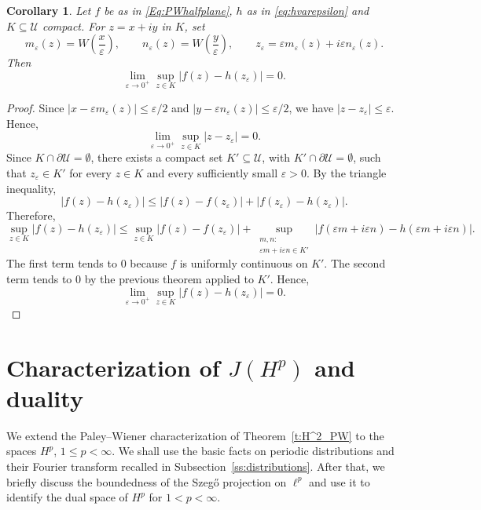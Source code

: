 \documentclass[12pt,a4paper,reqno]{amsart}
\newtheorem{cor}[thm]{Corollary}
\theoremstyle{definition}
\theoremstyle{definition}\newtheorem{defn}[thm]{Definition}
\begin{document}
    \begin{cor}
    Let $f$ be as in \eqref{Eq:PWhalfplane}, $h$ as in \eqref{eq:hvarepsilon} and $K\subseteq\mathcal U$ compact. For $z=x+iy$ in $K$, set
    \[
    m_\varepsilon(z)=W\!\left(\frac{x}{\varepsilon}\right),
    \qquad
    n_\varepsilon(z)=W\!\left(\frac{y}{\varepsilon}\right),\qquad z_\varepsilon
    =
    \varepsilon m_\varepsilon(z)
    +
    i\varepsilon n_\varepsilon(z).
    \]
    Then
    \[
    \lim_{\varepsilon\to 0^+}\sup_{z\in K}
    \left|
    f(z)-h(z_\varepsilon)
    \right|=0.
    \]
    \end{cor}
    \begin{proof}
    Since
    $
    \left|x-\varepsilon m_\varepsilon(z)\right|
    \leqslant \varepsilon/2$ and $
    \left|y-\varepsilon n_\varepsilon(z)\right|
    \leqslant \varepsilon/2$, we have $|z-z_\varepsilon|
    \leqslant \varepsilon$. Hence,
    \[
    \lim_{\varepsilon\to 0^+}\sup_{z\in K}|z-z_\varepsilon|=0.
    \]
    Since $K\cap \partial\mathcal U=\emptyset$, there exists a compact set
    $K'\subseteq\mathcal U$, with $K'\cap \partial\mathcal U=\emptyset$, such that
    $z_\varepsilon\in K'$ for every $z\in K$ and every sufficiently small
    $\varepsilon>0$. By the triangle inequality,
    \[
    |f(z)-h(z_\varepsilon)|
    \leqslant
    |f(z)-f(z_\varepsilon)|
    +
    |f(z_\varepsilon)-h(z_\varepsilon)|.
    \]
    Therefore,
    \[
    \sup_{z\in K}|f(z)-h(z_\varepsilon)|
    \leqslant
    \sup_{z\in K}|f(z)-f(z_\varepsilon)|+
    \sup_{\substack{m,n:\\
    \varepsilon m+i\varepsilon n\in K'}}
    |f(\varepsilon m+i\varepsilon n)
    -
    h(\varepsilon m+i\varepsilon n)|.
    \]
    The first term tends to $0$ because $f$ is uniformly continuous on $K'$. The second term tends to $0$ by the previous theorem applied to $K'$. Hence,
    \[
    \lim_{\varepsilon\to 0^+}\sup_{z\in K}|f(z)-h(z_\varepsilon)|=0.
    \]
    \end{proof}
    
    \section{Characterization of $J(H^p)$ and duality}\label{s:Hp_duality}
    We extend the Paley--Wiener characterization of Theorem~\ref{t:H^2_PW}
    to the spaces $H^p$, $1\leqslant p<\infty$. We shall use the basic facts on
    periodic distributions and their Fourier transform recalled in
    Subsection~\ref{ss:distributions}. After that, we briefly discuss the boundedness of the
    Szeg\H{o} projection on $\ell^p$ and use it to identify the dual space of
    $H^p$ for $1<p<\infty$.
    
\end{document}
